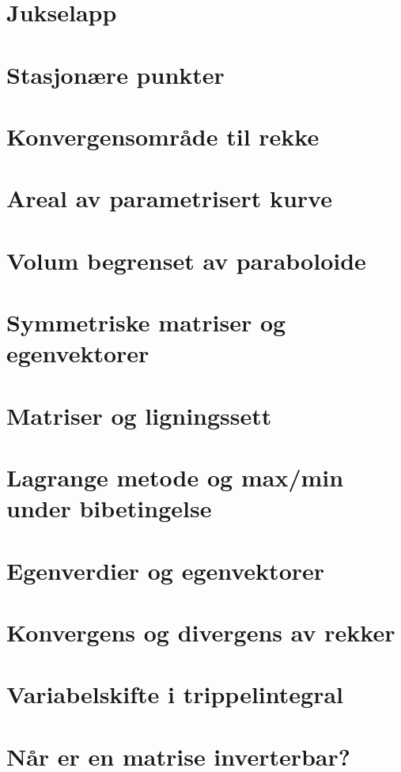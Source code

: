\documentclass{article}
\begin{document}
  \section*{Jukselapp}
    
  \section*{Stasjonære punkter}
    
  \section*{Konvergensområde til rekke}
    
  \section*{Areal av parametrisert kurve}
    
  \section*{Volum begrenset av paraboloide}
    
  \section*{Symmetriske matriser og egenvektorer}
    
  \section*{Matriser og ligningssett}
    
  \section*{Lagrange metode og max/min under bibetingelse}
    
  \section*{Egenverdier og egenvektorer}
    
  \section*{Konvergens og divergens av rekker}
    
  \section*{Variabelskifte i trippelintegral}
    
  \section*{Når er en matrise inverterbar?}
    
\end{document}
